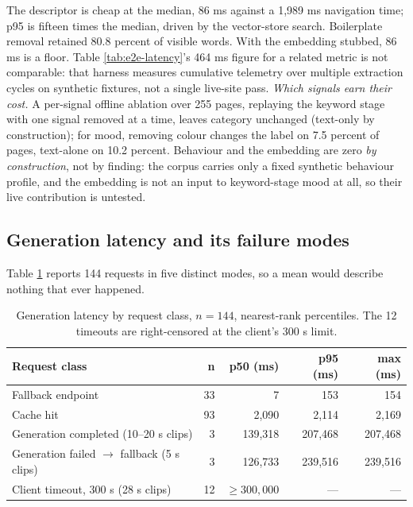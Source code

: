 \documentclass[conference]{IEEEtran}
\let\IEEEoriginalcaption\caption
\renewcommand{\caption}[1]{\IEEEoriginalcaption{\footnotesize #1}}
\begin{document}
The descriptor is cheap at the median, 86 ms against a 1,989 ms
navigation time; p95 is fifteen times the median, driven by the
vector-store search. Boilerplate removal retained 80.8 percent of visible
words. With the embedding stubbed, 86 ms is a floor. Table
\ref{tab:e2e-latency}'s 464 ms figure for a related metric is not comparable: that
harness measures cumulative telemetry over multiple extraction cycles on
synthetic fixtures, not a single live-site pass.
\label{sec:res-signal-ablation}
\emph{Which signals earn
their cost.} A per-signal offline ablation over 255 pages, replaying the
keyword stage with one signal removed at a time, leaves category
unchanged (text-only by construction); for mood, removing colour changes
the label on 7.5 percent of pages, text-alone on 10.2 percent. Behaviour
and the embedding are zero \emph{by construction}, not by finding: the
corpus carries only a fixed synthetic behaviour profile, and the
embedding is not an input to keyword-stage mood at all, so their live
contribution is untested.

\subsection{Generation latency and its failure modes}
\label{sec:res-latency}

Table \ref{tab:d-latency} reports 144 requests in five distinct modes, so
a mean would describe nothing that ever happened.

\begin{table}[t]
\caption{Generation latency by request class, $n=144$, nearest-rank
percentiles. The 12 timeouts are right-censored at the client's 300 s
limit.}
\label{tab:d-latency}
\begin{center}
\scriptsize
\setlength{\tabcolsep}{3pt}
\begin{tabular}{p{2.75cm}rrrr}
\toprule
\textbf{Request class} & \textbf{n} & \textbf{p50 (ms)} & \textbf{p95 (ms)} & \textbf{max (ms)} \\
\midrule
Fallback endpoint & 33 & 7 & 153 & 154 \\
Cache hit & 93 & 2{,}090 & 2{,}114 & 2{,}169 \\
Generation completed (10--20 s clips) & 3 & 139{,}318 & 207{,}468 & 207{,}468 \\
Generation failed $\to$ fallback (5 s clips) & 3 & 126{,}733 & 239{,}516 & 239{,}516 \\
Client timeout, 300 s (28 s clips) & 12 & $\geq 300{,}000$ & --- & --- \\
\bottomrule
\end{tabular}
\end{center}
\end{table}
\end{document}
